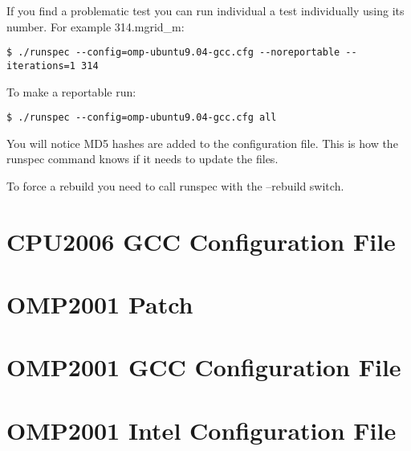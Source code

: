 \documentclass[12pt,twoside,a4paper]{article}
\begin{document}
If you find a problematic test you can run individual a test individually using its number. For example 314.mgrid\_m:
\begin{lstlisting}
$ ./runspec --config=omp-ubuntu9.04-gcc.cfg --noreportable --iterations=1 314
\end{lstlisting}

To make a reportable run:
\begin{lstlisting}
$ ./runspec --config=omp-ubuntu9.04-gcc.cfg all
\end{lstlisting}

You will notice MD5 hashes are added to the configuration file. This is how the runspec command knows if it needs to update the files.

To force a rebuild you need to call runspec with the --rebuild switch.

\appendix
\section{CPU2006 GCC Configuration File}

\section{OMP2001 Patch}

\section{OMP2001 GCC Configuration File}

\section{OMP2001 Intel Configuration File}

\end{document}
